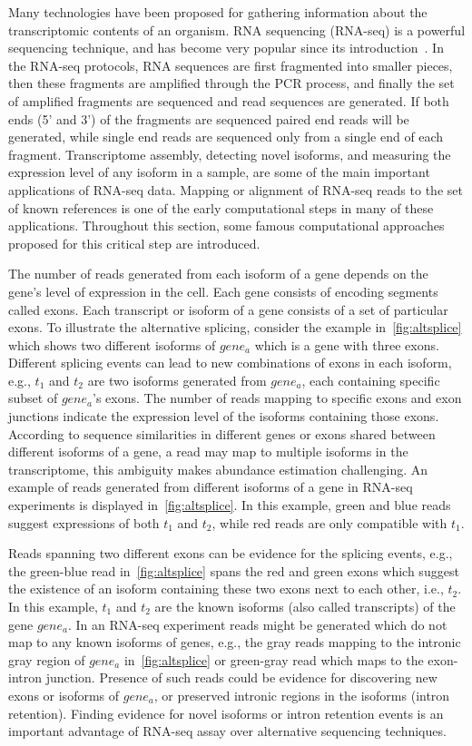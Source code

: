 Many technologies have been proposed for gathering information about 
the transcriptomic contents of an organism. RNA sequencing (RNA-seq) is a 
powerful sequencing technique, and has become very popular since its 
introduction~\citep{mortazavi}. In the RNA-seq protocols, RNA sequences are 
first fragmented into smaller pieces, then these fragments are amplified 
through the PCR process, and finally the set of amplified fragments are 
sequenced and read sequences are generated. If both ends (5' and 3') of the 
fragments are sequenced paired end reads will be generated, while single 
end reads are sequenced only from a single end of each fragment.
Transcriptome assembly, detecting novel isoforms, and measuring the 
expression level of any isoform in a sample, are some of the main 
important applications of RNA-seq data. Mapping or alignment of RNA-seq 
reads to the set of known references is one of the early computational 
steps in many of these applications. Throughout this section, some famous 
computational approaches proposed for this critical step are introduced.


The number of reads generated from each isoform of a gene depends on the 
gene's level of expression in the cell. Each gene consists of encoding 
segments called exons. Each transcript or isoform of a gene consists of 
a set of particular exons. To illustrate the alternative splicing, consider 
the example in~\cref{fig:altsplice} which shows two different isoforms of 
$gene_a$ which is a gene with three exons. Different splicing events can 
lead to new combinations of exons in each isoform, e.g., $t_1$ and $t_2$ 
are two isoforms generated from $gene_a$, each containing specific subset 
of $gene_a$'s exons.
The number of reads mapping to specific exons and exon junctions indicate 
the expression level of the isoforms containing those exons. According to 
sequence similarities in different genes or exons shared between different 
isoforms of a gene, a read may map to multiple isoforms in the transcriptome, 
this ambiguity makes abundance estimation challenging. An example of reads 
generated from different isoforms of a gene in RNA-seq experiments is displayed 
in~\cref{fig:altsplice}. In this example, green and blue reads suggest 
expressions of both $t_1$ and $t_2$, while red reads are only compatible 
with $t_1$. 

Reads spanning two different exons can be evidence for the splicing events, 
e.g., the green-blue read in~\cref{fig:altsplice} spans the red and green 
exons which suggest the existence of an isoform containing these two exons 
next to each other, i.e., $t_2$. In this example, $t_1$ and $t_2$ are the 
known isoforms (also called transcripts) of the gene $gene_a$. In an RNA-seq 
experiment reads might be generated which do not map to any known isoforms of 
genes, e.g., the gray reads mapping to the intronic gray region of $gene_a$ 
in~\cref{fig:altsplice} or green-gray read which maps to the exon-intron 
junction. Presence of such reads could be evidence for discovering new exons 
or isoforms of $gene_a$, or preserved intronic regions in the isoforms (intron 
retention). Finding evidence for novel isoforms or intron retention events is 
an important advantage of RNA-seq assay over alternative sequencing techniques.

